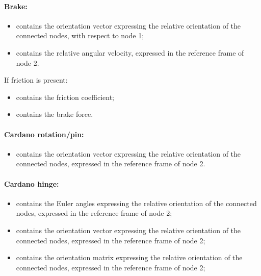 \paragraph{Brake:}
\begin{itemize}
\item {} contains the orientation vector 
  expressing the relative orientation of the connected nodes, with respect to node 1;
\item {} contains the relative angular
  velocity, expressed in the reference frame of node 2.
\end{itemize}

If friction is present:
\begin{itemize}
\item {} contains the friction coefficient;
\item {} contains the brake force.
\end{itemize}

\paragraph{Cardano rotation/pin:}
\begin{itemize}
\item {} contains the orientation vector
  expressing the relative orientation of the connected nodes, expressed in 
  the reference frame of node 2.
\end{itemize}

\paragraph{Cardano hinge:}
\begin{itemize}
\item {} contains the Euler angles 
  expressing the relative orientation of the connected nodes, expressed in 
  the reference frame of node 2;
\item {} contains the orientation vector
  expressing the relative orientation of the connected nodes, expressed in 
  the reference frame of node 2;
\item {} contains the orientation matrix
  expressing the relative orientation of the connected nodes, expressed in 
  the reference frame of node 2;
\end{itemize}

